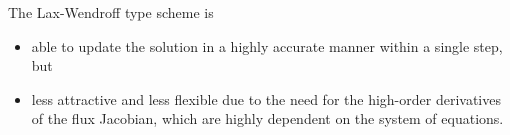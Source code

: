 The Lax-Wendroff type scheme is
\begin{itemize}
    \item able to update the solution in a highly accurate manner within a single step, but
    \item less attractive and less flexible due to the need for the high-order derivatives of the flux Jacobian, which are highly dependent on the system of equations.
\end{itemize}
